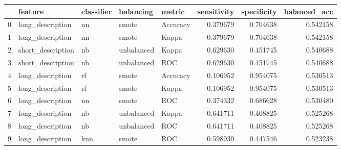 \begin{tabular}{lllllrrr}
\toprule
{} &            feature & classifier &   balancing &    metric &  sensitivity &  specificity &  balanced\_acc \\
\midrule
0 &   long\_description &         nn &       smote &  Accuracy &     0.379679 &     0.704638 &      0.542158 \\
1 &   long\_description &         nn &       smote &     Kappa &     0.379679 &     0.704638 &      0.542158 \\
2 &  short\_description &         nb &  unbalanced &     Kappa &     0.629630 &     0.451745 &      0.540688 \\
3 &  short\_description &         nb &  unbalanced &       ROC &     0.629630 &     0.451745 &      0.540688 \\
4 &   long\_description &         rf &       smote &  Accuracy &     0.106952 &     0.954075 &      0.530513 \\
5 &   long\_description &         rf &       smote &     Kappa &     0.106952 &     0.954075 &      0.530513 \\
6 &   long\_description &         nn &       smote &       ROC &     0.374332 &     0.686628 &      0.530480 \\
7 &   long\_description &         nb &  unbalanced &     Kappa &     0.641711 &     0.408825 &      0.525268 \\
8 &   long\_description &         nb &  unbalanced &       ROC &     0.641711 &     0.408825 &      0.525268 \\
9 &   long\_description &        knn &       smote &       ROC &     0.598930 &     0.447546 &      0.523238 \\
\bottomrule
\end{tabular}
